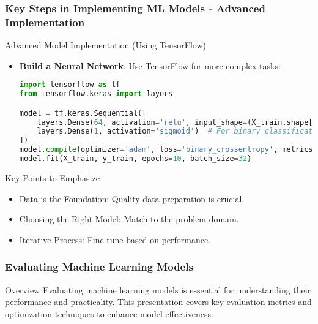 \documentclass[aspectratio=169]{beamer}
\begin{document}
\begin{frame}[fragile]
    \frametitle{Key Steps in Implementing ML Models - Advanced Implementation}
    \begin{block}{Advanced Model Implementation (Using TensorFlow)}
    \begin{itemize}
        \item \textbf{Build a Neural Network}:
        Use TensorFlow for more complex tasks:
        \begin{lstlisting}[language=Python]
import tensorflow as tf
from tensorflow.keras import layers

model = tf.keras.Sequential([
    layers.Dense(64, activation='relu', input_shape=(X_train.shape[1],)),
    layers.Dense(1, activation='sigmoid')  # For binary classification
])
model.compile(optimizer='adam', loss='binary_crossentropy', metrics=['accuracy'])
model.fit(X_train, y_train, epochs=10, batch_size=32)
        \end{lstlisting}
    \end{itemize}
    \end{block}
    
    \begin{block}{Key Points to Emphasize}
    \begin{itemize}
        \item Data is the Foundation: Quality data preparation is crucial.
        \item Choosing the Right Model: Match to the problem domain.
        \item Iterative Process: Fine-tune based on performance.
    \end{itemize}
    \end{block}
\end{frame}

\begin{frame}
    \frametitle{Evaluating Machine Learning Models}
    \begin{block}{Overview}
        Evaluating machine learning models is essential for understanding their performance and practicality. 
        This presentation covers key evaluation metrics and optimization techniques to enhance model effectiveness.
    \end{block}
\end{frame}
\end{document}
